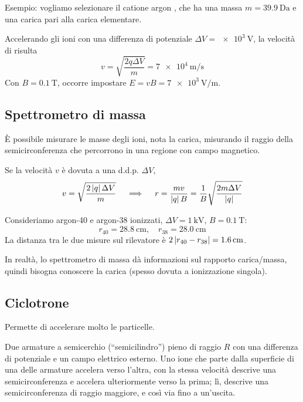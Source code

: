 Esempio: vogliamo selezionare il catione argon , che ha una massa $m = \qty{39.9}{\dalton}$ e una carica pari alla carica elementare.

Accelerando gli ioni con una differenza di potenziale $\Delta V = \qty{e3}{\volt}$, la velocità di  risulta
\begin{equation}
    v = \sqrt{\frac{2q\Delta V}{m}} = \qty{7e4}{\metre\per\second}
\end{equation}
Con $B = \qty{0.1}{\tesla}$, occorre impostare $E = vB = \qty{7e3}{\volt\per\metre}$.

\subsection{Spettrometro di massa}
\label{sec:spettrometro_massa}

È possibile misurare le masse degli ioni, nota la carica, misurando il raggio della semicirconferenza che percorrono in una regione con campo magnetico.

Se la velocità $v$ è dovuta a una d.d.p. $\Delta V$,
\begin{equation}
    v = \sqrt{\frac{2 \left\lvert q \right\rvert \Delta V}{m}}
    \quad \implies \quad
    r = \frac{mv}{\left\lvert q \right\rvert B} = \frac{1}{B}\sqrt{\frac{2 m \Delta V}{\left\lvert q \right\rvert}}
\end{equation}

Consideriamo argon-40 e argon-38 ionizzati, $\Delta V = \qty{1}{\kilo\volt}$, $B = \qty{0.1}{\tesla}$:
\begin{equation}
    r_{40} = \qty{28.8}{\centi\metre}, \quad r_{38} = \qty{28.0}{\centi\metre}
\end{equation}
La distanza tra le due misure sul rilevatore è $2 \left\lvert r_{40} - r_{38} \right\rvert = \qty{1.6}{\centi\metre}$.

In realtà, lo spettrometro di massa dà informazioni sul rapporto carica/massa, quindi bisogna conoscere la carica (spesso dovuta a ionizzazione singola).


\subsection{Ciclotrone}

Permette di accelerare molto le particelle.

Due armature a semicerchio (``semicilindro'') pieno di raggio $R$ con una differenza di potenziale e un campo elettrico esterno.
Uno ione che parte dalla superficie di una delle armature accelera verso l'altra, con la stessa velocità descrive una semicirconferenza e accelera ulteriormente verso la prima; lì, descrive una semicirconferenza di raggio maggiore, e così via fino a un'uscita.

